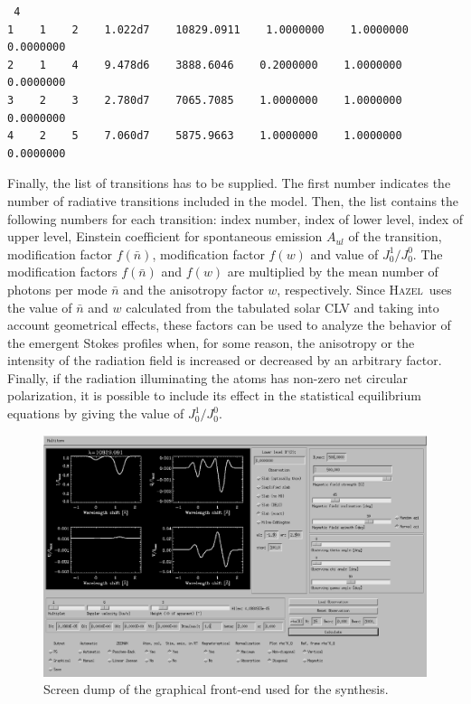 \documentclass[12pt]{article}
\def\H{\textsc{Hazel}}
\begin{document}
\begin{verbatim}
 4
1    1    2    1.022d7    10829.0911    1.0000000    1.0000000    0.0000000
2    1    4    9.478d6    3888.6046    0.2000000    1.0000000    0.0000000
3    2    3    2.780d7    7065.7085    1.0000000    1.0000000    0.0000000
4    2    5    7.060d7    5875.9663    1.0000000    1.0000000    0.0000000
\end{verbatim}
Finally, the list of transitions has to be supplied. The first number indicates the number
of radiative transitions included in the model. Then, the list contains the following 
numbers for each transition: index number, index of lower level, index of upper level, Einstein
coefficient for spontaneous emission $A_{ul}$ of the transition, modification factor $f(\bar{n})$,
modification factor $f(w)$ and value of $J^1_0/J^0_0$. The modification factors $f(\bar{n})$ and
$f(w)$ are multiplied by the mean number of photons per mode $\bar{n}$ and the anisotropy factor $w$,
respectively. Since \H\ uses the value of $\bar{n}$ and $w$ calculated from the tabulated solar CLV
and taking into account geometrical effects,
these factors can be used to analyze the behavior of the emergent Stokes profiles when, for some
reason, the anisotropy or the intensity of the radiation field is increased or decreased by an
arbitrary factor. Finally, if the radiation illuminating the atoms has non-zero net circular polarization,
it is possible to include its effect in the statistical equilibrium equations by giving the value of 
$J^1_0/J^0_0$.

\begin{figure}
\includegraphics[width=\columnwidth]{f5.eps}
\caption{Screen dump of the graphical front-end used for the synthesis.
\label{fig:synthesis_GUI}}
\end{figure}
\end{document}
